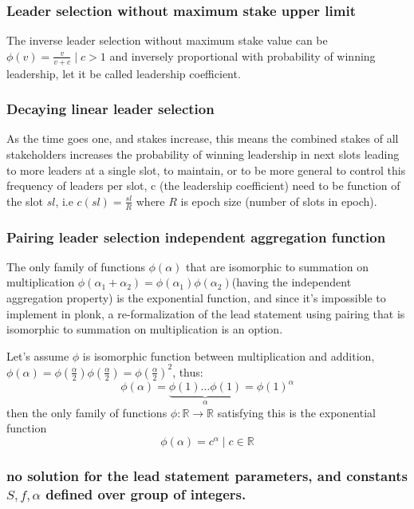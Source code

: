 \documentclass[a4paper]{article}
\begin{document}
\subsubsection{ Leader selection without maximum stake upper limit}

The inverse leader selection without maximum stake value can be
$\phi(v)=\frac{v}{v+c} \mid c  > 1$ and inversely proportional
with probability of winning leadership, let it be called leadership
coefficient.


\subsubsection{ Decaying linear leader selection}

As the time goes one, and stakes increase, this means the combined stakes
of all stakeholders increases the probability of winning leadership
in next slots leading to more leaders at a single slot, to maintain,
or to be more general to control this frequency of leaders per slot, c
(the leadership coefficient) need to be function of the slot $sl$, i.e
$c(sl) = \frac{sl}{R}$ where $R$ is epoch size (number of slots in epoch).

\subsubsection{ Pairing leader selection independent aggregation function}

The only family of functions $\phi(\alpha)$ that are isomorphic
to summation on multiplication $\phi(\alpha_1+\alpha_2)
= \phi(\alpha_1)\phi(\alpha_2)$(having the independent aggregation
property) is the exponential function, and since it's impossible to
implement in plonk,  a re-formalization of the lead statement using
pairing that is isomorphic to summation on multiplication is an option.

Let's assume $\phi$ is isomorphic function
between multiplication and addition, $\phi(\alpha) =
\phi(\frac{\alpha}{2})\phi(\frac{\alpha}{2})=\phi(\frac{\alpha}{2})^2$,
thus:
$$\phi(\alpha)=\underbrace{\phi(1)\dots\phi(1)}_\text{$\alpha$}=\phi(1)^\alpha$$
then the only family of functions $\phi : \mathbb{R} \rightarrow
\mathbb{R}$ satisfying this is the exponential function
$$\phi(\alpha)=c^{\alpha} \mid c  \in \mathbb{R}$$

\subsubsection{ no solution for the lead statement parameters, and constants $S,f, \alpha$ defined over group of integers.}
\end{document}
